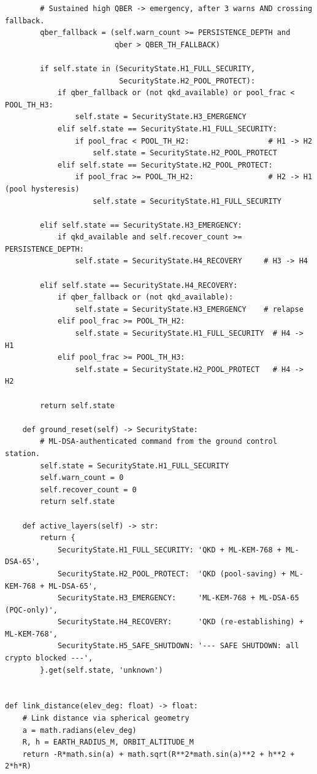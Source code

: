 \documentclass[a4paper,14pt]{extreport}
\begin{document}
\begin{latin}
\begin{verbatim}
        # Sustained high QBER -> emergency, after 3 warns AND crossing fallback.
        qber_fallback = (self.warn_count >= PERSISTENCE_DEPTH and
                         qber > QBER_TH_FALLBACK)

        if self.state in (SecurityState.H1_FULL_SECURITY,
                          SecurityState.H2_POOL_PROTECT):
            if qber_fallback or (not qkd_available) or pool_frac < POOL_TH_H3:
                self.state = SecurityState.H3_EMERGENCY
            elif self.state == SecurityState.H1_FULL_SECURITY:
                if pool_frac < POOL_TH_H2:                  # H1 -> H2
                    self.state = SecurityState.H2_POOL_PROTECT
            elif self.state == SecurityState.H2_POOL_PROTECT:
                if pool_frac >= POOL_TH_H2:                 # H2 -> H1 (pool hysteresis)
                    self.state = SecurityState.H1_FULL_SECURITY

        elif self.state == SecurityState.H3_EMERGENCY:
            if qkd_available and self.recover_count >= PERSISTENCE_DEPTH:
                self.state = SecurityState.H4_RECOVERY     # H3 -> H4

        elif self.state == SecurityState.H4_RECOVERY:
            if qber_fallback or (not qkd_available):
                self.state = SecurityState.H3_EMERGENCY    # relapse
            elif pool_frac >= POOL_TH_H2:
                self.state = SecurityState.H1_FULL_SECURITY  # H4 -> H1
            elif pool_frac >= POOL_TH_H3:
                self.state = SecurityState.H2_POOL_PROTECT   # H4 -> H2

        return self.state

    def ground_reset(self) -> SecurityState:
        # ML-DSA-authenticated command from the ground control station.
        self.state = SecurityState.H1_FULL_SECURITY
        self.warn_count = 0
        self.recover_count = 0
        return self.state

    def active_layers(self) -> str:
        return {
            SecurityState.H1_FULL_SECURITY: 'QKD + ML-KEM-768 + ML-DSA-65',
            SecurityState.H2_POOL_PROTECT:  'QKD (pool-saving) + ML-KEM-768 + ML-DSA-65',
            SecurityState.H3_EMERGENCY:     'ML-KEM-768 + ML-DSA-65 (PQC-only)',
            SecurityState.H4_RECOVERY:      'QKD (re-establishing) + ML-KEM-768',
            SecurityState.H5_SAFE_SHUTDOWN: '--- SAFE SHUTDOWN: all crypto blocked ---',
        }.get(self.state, 'unknown')


def link_distance(elev_deg: float) -> float:
    # Link distance via spherical geometry
    a = math.radians(elev_deg)
    R, h = EARTH_RADIUS_M, ORBIT_ALTITUDE_M
    return -R*math.sin(a) + math.sqrt(R**2*math.sin(a)**2 + h**2 + 2*h*R)



\end{verbatim}
\end{latin}
\end{document}
